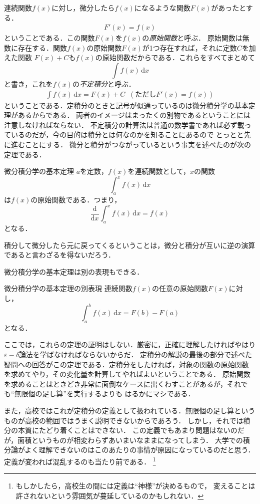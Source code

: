 連続関数$f(x)$に対し，微分したら$f(x)$になるような関数$F(x)$があったとする．
\begin{eqnarray}
F'(x) = f(x)
\label{eq:ghuteisekibun}
\end{eqnarray}
ということである．この関数$F(x)$を$f(x)$の\emph{原始関数}と呼ぶ．
原始関数は無数に存在する．関数$f(x)$の原始関数$F(x)$が1つ存在すれば，それに定数$C$を加えた関数
$F(x)+C$も$f(x)$の原始関数だからである．これらをすべてまとめて
$$
\int f(x) \, \mathrm{d}x
$$
と書き，これを$f(x)$の\emph{不定積分}と呼ぶ．
\begin{eqnarray}
\int f(x) \, \mathrm{d}x = F(x) + C \;\; (\text{ただし} F'(x)=f(x))
\label{eq:huteisekibun}
\end{eqnarray}
ということである．定積分のときと記号が似通っているのは微分積分学の基本定理があるからである．
両者のイメージはまったくの別物であるということには注意しなければならない．
不定積分の計算法は普通の数学書であれば必ず載っているのだが，今の目的は積分とは何なのかを知ることにあるので
とっとと先に進むことにする．
微分と積分がつながっているという事実を述べたのが次の定理である．
\begin{itembox}[l]{微分積分学の基本定理}
$a$を定数，$f(x)$を連続関数として，$x$の関数
$$
\int_{a}^{x} f(x) \, \mathrm{d}x
$$
は$f(x)$の原始関数である．つまり，
$$
\frac{\mathrm{d}}{\mathrm{d}x}\int_{a}^{x} f(x) \, \mathrm{d}x = f(x)
$$
となる．
\end{itembox}
積分して微分したら元に戻ってくるということは，微分と積分が互いに逆の演算であると言わざるを得ないだろう．

微分積分学の基本定理は別の表現もできる．
\begin{itembox}[l]{微分積分学の基本定理の別表現}
連続関数$f(x)$の任意の原始関数$F(x)$に対し，
$$
\int_{a}^{b} f(x) \, \mathrm{d}x = F(b)-F(a)
$$
となる．
\end{itembox}
ここでは，これらの定理の証明はしない．厳密に，正確に理解したければやはり$\varepsilon - \delta$論法を学ばなければならないからだ．
定積分の解説の最後の部分で述べた疑問への回答がこの定理である．定積分をしたければ，対象の関数の原始関数
を求めてやり，その変化量を計算してやればよいということである．
原始関数を求めることはときどき非常に面倒なケースに出くわすことがあるが，それでも``無限個の足し算''を実行するよりも
はるかにマシである．

また，高校ではこれが定積分の定義として扱われている．無限個の足し算というものが高校の範囲ではうまく説明できないからであろう．
しかし，それでは積分の本質にたどり着くことはできない．
この定義でもあまり問題はないのだが，面積というものが相変わらずあいまいなままになってしまう．
大学での積分論がよく理解できないのはこのあたりの事情が原因になっているのだと思う．
定義が変われば混乱するのも当たり前である．
\footnote{もしかしたら，高校生の間には定義は``神様''が決めるもので，
変えることは許されないという雰囲気が蔓延しているのかもしれない．}

